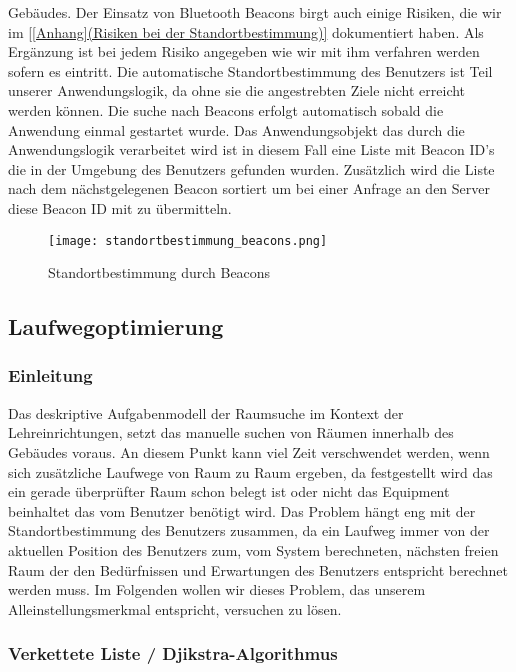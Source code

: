 Gebäudes. Der Einsatz von Bluetooth Beacons birgt auch einige Risiken, die wir
im \ref{[Anhang](Risiken bei der Standortbestimmung)} dokumentiert haben.
Als Ergänzung ist bei jedem Risiko angegeben wie wir mit ihm verfahren werden
sofern es eintritt. Die automatische Standortbestimmung des Benutzers ist Teil
unserer Anwendungslogik, da ohne sie die angestrebten Ziele nicht erreicht
werden können. Die suche nach Beacons erfolgt automatisch sobald die Anwendung
einmal gestartet wurde. Das Anwendungsobjekt das durch die Anwendungslogik
verarbeitet wird ist in diesem Fall eine Liste mit Beacon ID's die in der
Umgebung des Benutzers gefunden wurden. Zusätzlich wird die Liste nach dem
nächstgelegenen Beacon sortiert um bei einer Anfrage an den Server diese
Beacon ID mit zu übermitteln.

\begin{figure}
	\centering
	\texttt{[image: standortbestimmung\_beacons.png]}
	\caption{Standortbestimmung durch Beacons}
\end{figure}


\subsection{Laufwegoptimierung}
\label{sec:Laufwegoptimierung}

\subsubsection{Einleitung}
\label{sec:Laufwegoptimierung Einleitung}

Das deskriptive Aufgabenmodell der Raumsuche im Kontext der Lehreinrichtungen,
setzt das manuelle suchen von Räumen innerhalb des Gebäudes voraus. An diesem
Punkt kann viel Zeit verschwendet werden, wenn sich zusätzliche Laufwege von
Raum zu Raum ergeben, da festgestellt wird das ein gerade überprüfter Raum
schon belegt ist oder nicht das Equipment beinhaltet das vom Benutzer benötigt
wird. Das Problem hängt eng mit der Standortbestimmung des Benutzers zusammen,
da ein Laufweg immer von der aktuellen Position des Benutzers zum, vom System
berechneten, nächsten freien Raum der den Bedürfnissen und Erwartungen des
Benutzers entspricht berechnet werden muss. Im Folgenden wollen wir dieses
Problem, das unserem Alleinstellungsmerkmal entspricht, versuchen zu lösen.

\subsubsection{Verkettete Liste / Djikstra-Algorithmus}
\label{sec:Verkettete Liste / Djikstra-Algorithmus}

